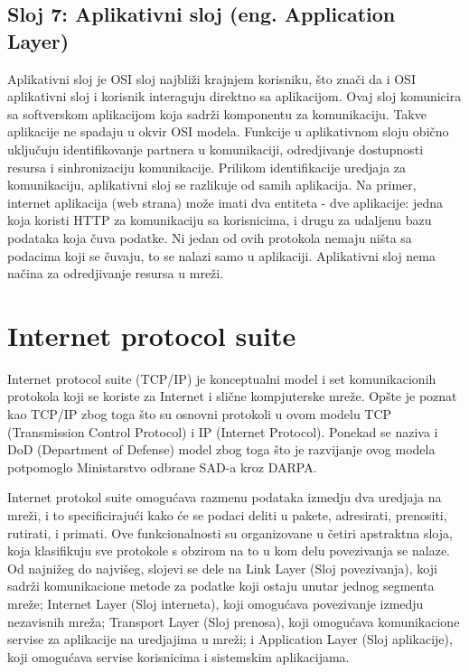 \documentclass[a4paper,12pt, master]{etf}
\begin{document}
	\subsection{Sloj 7: Aplikativni sloj (eng\@. Application Layer)}

	Aplikativni sloj je OSI sloj najbli\v{z}i krajnjem korisniku, \v{s}to
	zna\v{c}i da i OSI aplikativni sloj i korisnik interaguju direktno sa
	aplikacijom. Ovaj sloj komunicira sa softverskom aplikacijom koja
	sadr\v{z}i komponentu za komunikaciju. Takve aplikacije ne spadaju u okvir
	OSI modela.	Funkcije u aplikativnom sloju obi\v{c}no uklju\v{c}uju
	identifikovanje partnera u komunikaciji, odredjivanje dostupnosti resursa i
	sinhronizaciju komunikacije. Prilikom identifikacije uredjaja za
	komunikaciju, aplikativni sloj se razlikuje od samih aplikacija. Na primer,
	internet aplikacija (web strana) mo\v{z}e imati dva entiteta - dve
	aplikacije: jedna koja koristi HTTP za komunikaciju sa korisnicima, i drugu
	za udaljenu	bazu podataka koja \v{c}uva podatke. Ni jedan od ovih protokola
	nemaju ni\v{s}ta sa podacima koji se \v{c}uvaju, to se nalazi samo u
	aplikaciji. Aplikativni sloj nema na\v{c}ina za odredjivanje resursa u
	mre\v{z}i.

	\section{Internet protocol suite}

	Internet protocol suite (TCP/IP) je konceptualni model i set komunikacionih
	protokola koji se koriste za Internet i sli\v{c}ne kompjuterske mre\v{z}e.
	Op\v{s}te je poznat kao TCP/IP zbog toga \v{s}to su osnovni protokoli u
	ovom modelu TCP (Transmission Control Protocol) i IP (Internet Protocol).
	Ponekad se naziva i DoD (Department of Defense) model zbog toga \v{s}to je
	razvijanje ovog modela potpomoglo Ministarstvo odbrane SAD-a kroz DARPA.

	Internet protokol suite omogu\'{c}ava razmenu podataka izmedju dva uredjaja
    na mre\v{z}i, i to specificiraju\'{c}i kako \'{c}e se podaci deliti u
    pakete, adresirati, prenositi, rutirati, i primati. Ove funkcionalnosti su
    organizovane u \v{c}etiri apstraktna sloja, koja klasifikuju sve protokole
    s obzirom na to u kom delu povezivanja se nalaze. Od najni\v{z}eg do
    najvi\v{s}eg, slojevi se dele na Link Layer (Sloj povezivanja), koji
    sadr\v{z}i komunikacione metode za podatke koji ostaju unutar jednog
    segmenta mre\v{z}e; Internet Layer (Sloj interneta), koji omogu\'{c}ava
    povezivanje izmedju nezavisnih mre\v{z}a; Transport Layer (Sloj prenosa),
    koji omogu\'{c}ava komunikacione servise za aplikacije na uredjajima u
    mre\v{z}i; i Application Layer (Sloj aplikacije), koji omogu\'{c}ava
    servise korisnicima i sistemskim aplikacijama.
\end{document}
